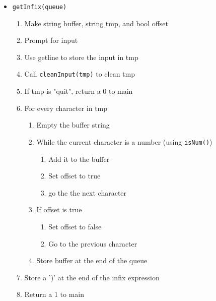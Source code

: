 \documentclass{article}
\begin{document}
\begin{itemize}
            \item{\texttt{getInfix(queue)}}
                \begin{enumerate}
                    \item Make string buffer, string tmp, and bool offset
                    \item Prompt for input
                    \item Use getline to store the input in tmp
                    \item Call \texttt{cleanInput(tmp)} to clean tmp
                    \item If tmp is "quit", return a 0 to main
                    \item For every character in tmp
                        \begin{enumerate}
                            \item Empty the buffer string
                            \item While the current character is a number (using \texttt{isNum()})
                                \begin{enumerate}
                                    \item Add it to the buffer
                                    \item Set offset to true
                                    \item go the the next character
                                \end{enumerate}  
                        \item If offset is true
                            \begin{enumerate}
                                \item Set offset to false
                                \item Go to the previous character
                            \end{enumerate}
                        \item Store buffer at the end of the queue
                    \end{enumerate}
                    \item Store a ')' at the end of the infix expression
                    \item Return a 1 to main
                \end{enumerate}


\end{itemize}
\end{document}
